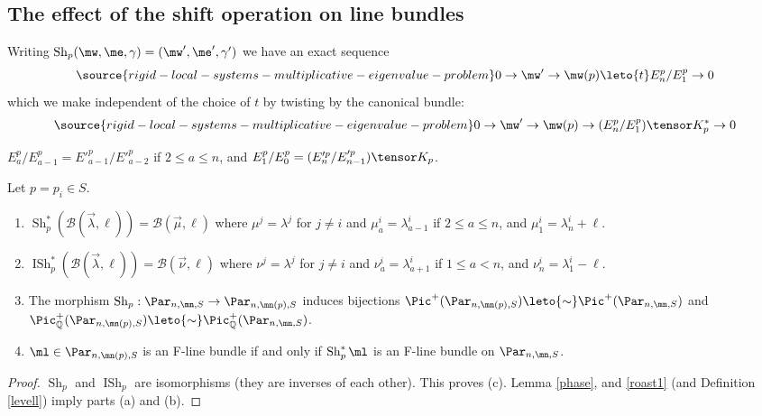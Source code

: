 \subsection{The effect of the shift operation on line bundles}
Writing
$\operatorname{Sh}_p(\mw,\me,\gamma)=(\mw',\me',\gamma')$
we have an exact sequence
\begin{equation}\label{roast1}
\source{rigid-local-systems-multiplicative-eigenvalue-problem}
0\to \mw'\to \mw(p)\leto{t} E^p_n/E^p_1\to 0
\end{equation}
which we make independent of the choice of $t$ by twisting by the canonical bundle:
\begin{equation}\label{roast}
\source{rigid-local-systems-multiplicative-eigenvalue-problem}
0\to \mw'\to \mw(p)\to(E^p_n/E^p_1)\tensor K_p^*\to 0
\end{equation}
\begin{lemma}
\notready\label{phase}
$E^p_a/E^p_{a-1}=E'^p_{a-1}/E'^p_{a-2}$ if $2\leq a\leq n$, and $E^p_1/E^p_0=(E'^p_n/E'^p_{n-1})\tensor K_p$.
\end{lemma}

\begin{proposition}
\notready\label{easily}
Let $p=p_i\in S$.
\begin{enumerate}
\item[(a)] $\operatorname{Sh}_p^*(\mathcal{B}(\vec{\lambda},\ell))= \mathcal{B}(\vec{\mu},\ell)$
where $\mu^j=\lambda^j$ for $j\neq i$ and $\mu^i_a= \lambda^i_{a-1}$ if $2\leq a\leq n$, and $\mu^i_1=\lambda^i_{n}+\ell$.
\item[(b)] $\operatorname{ISh}_p^*(\mathcal{B}(\vec{\lambda},\ell))= \mathcal{B}(\vec{\nu},\ell)$
where $\nu^j=\lambda^j$ for $j\neq i$ and $\nu^i_a= \lambda^i_{a+1}$ if $1\leq a< n$, and $\nu^i_{n}=\lambda^i_{1}-\ell$.

\item[(c)]The morphism $\operatorname{Sh}_p: \Par_{n,\mn,S}\to \Par_{n,\mn(p),S}$ induces bijections $\Pic^+(\Par_{n,\mn(p),S})\leto{\sim}\Pic^+(\Par_{n,\mn,S})$ and
$\Pic^+_{\Bbb{Q}}(\Par_{n,\mn(p),S})\leto{\sim}\Pic^+_{\Bbb{Q}}(\Par_{n,\mn,S})$.
\item[(d)] $\ml\in  \Par_{n,\mn(p),S}$ is an F-line bundle if and only if $\operatorname{Sh}_p^*\ml$ is an F-line bundle on  $\Par_{n,\mn,S}$.
\end{enumerate}
\end{proposition}
\begin{proof}
$\operatorname{Sh}_p$ and $\operatorname{ISh}_p$ are isomorphisms (they are inverses of each other). This proves (c). Lemma \ref{phase}, and \eqref{roast1}  (and Definition  \ref{levell}) imply parts (a) and (b). \end{proof}

